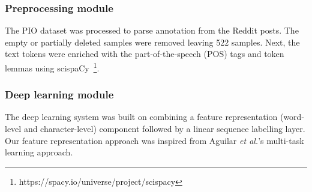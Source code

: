 \documentclass[11pt]{article}
\begin{document}
\subsubsection{Preprocessing module}
%
The PIO dataset was processed to parse annotation from the Reddit posts.
The empty or partially deleted samples were removed leaving 522 samples.
Next, the text tokens were enriched with the part-of-the-speech (POS) tags and token lemmas using scispaCy~\footnote{https://spacy.io/universe/project/scispacy}.
%
%
%
\subsubsection{Deep learning module}
%
The deep learning system was built on combining a feature representation (word-level and character-level) component followed by a linear sequence labelling layer.
Our feature representation approach was inspired from Aguilar \textit{et al.}'s multi-task learning approach.~\cite{aguilar2019multi}
%
%
%
\end{document}
